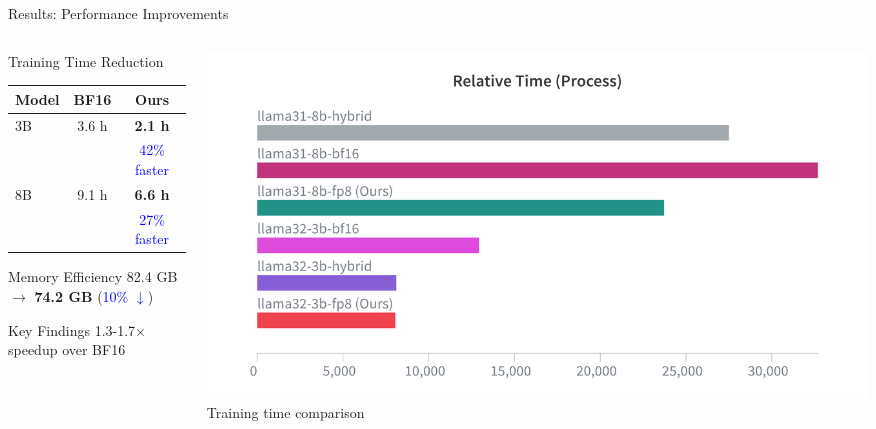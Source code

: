 \begin{frame}[squeeze]{Results: Performance Improvements}

\begin{columns}[c]
\begin{column}{0.4\textwidth}
    \begin{block}{Training Time Reduction}
    \small
    \begin{tabular}{@{}lcc@{}}
    \toprule
    \textbf{Model} & \textbf{BF16} & \textbf{Ours} \\
    \midrule
    3B & 3.6 h & \textbf{2.1 h} \\
    & & {\footnotesize \textcolor{blue}{42\% faster}} \\
    \midrule
    8B & 9.1 h & \textbf{6.6 h} \\
    & & {\footnotesize \textcolor{blue}{27\% faster}} \\
    \bottomrule
    \end{tabular}
    \end{block}

    \vspace{0.15cm}

    \begin{block}{Memory Efficiency}
    \small
    82.4 GB $\rightarrow$ \textbf{74.2 GB} (\textcolor{blue}{10\% $\downarrow$})
    \end{block}

    \vspace{0.15cm}

    \begin{alertblock}{Key Findings}
    \small
    1.3-1.7$\times$ speedup over BF16
    \end{alertblock}
\end{column}

\begin{column}{0.6\textwidth}
    \centering
    \includegraphics[width=\textwidth]{figures/training_time.png}
    {\tiny Training time comparison}
\end{column}
\end{columns}

\end{frame}

